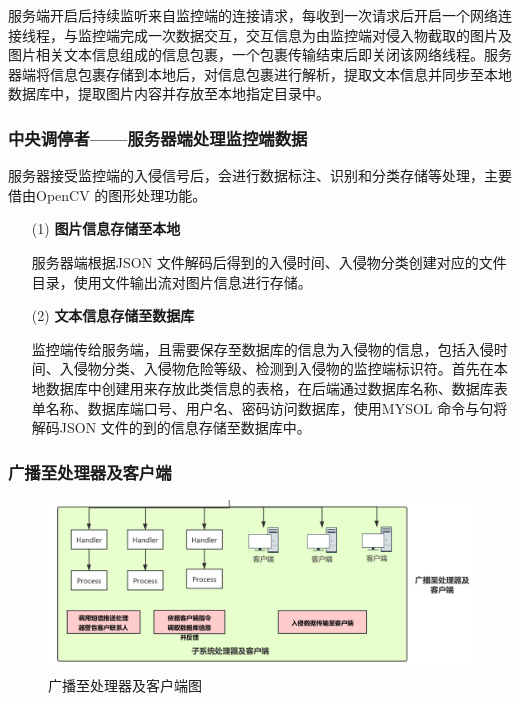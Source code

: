 \documentclass[article]{BJTU-thesis}
\begin{document}
服务端开启后持续监听来自监控端的连接请求，每收到一次请求后开启一个网络连接线程，与监控端完成一次数据交互，交互信息为由监控端对侵入物截取的图片及图片相关文本信息组成的信息包裹，一个包裹传输结束后即关闭该网络线程。服务器端将信息包裹存储到本地后，对信息包裹进行解析，提取文本信息并同步至本地数据库中，提取图片内容并存放至本地指定目录中。

\subsubsection{中央调停者——服务器端处理监控端数据}

服务器接受监控端的入侵信号后，会进行数据标注、识别和分类存储等处理，主要借由OpenCV 的图形处理功能。

\begin{enumerate}
	\item[(1)] \textbf{图片信息存储至本地}
	
	服务器端根据JSON 文件解码后得到的入侵时间、入侵物分类创建对应的文件目录，使用文件输出流对图片信息进行存储。
	
	\item[(2)] \textbf{文本信息存储至数据库}
	
	监控端传给服务端，且需要保存至数据库的信息为入侵物的信息，包括入侵时间、入侵物分类、入侵物危险等级、检测到入侵物的监控端标识符。首先在本地数据库中创建用来存放此类信息的表格，在后端通过数据库名称、数据库表单名称、数据库端口号、用户名、密码访问数据库，使用MYSOL 命令与句将解码JSON 文件的到的信息存储至数据库中。
\end{enumerate}

\newpage
\subsubsection{广播至处理器及客户端}
\begin{figure}[!htbp]
	\centering
	\includegraphics[scale=.2]{img/t5.png}
	\caption{广播至处理器及客户端图}
\end{figure}
\end{document}
